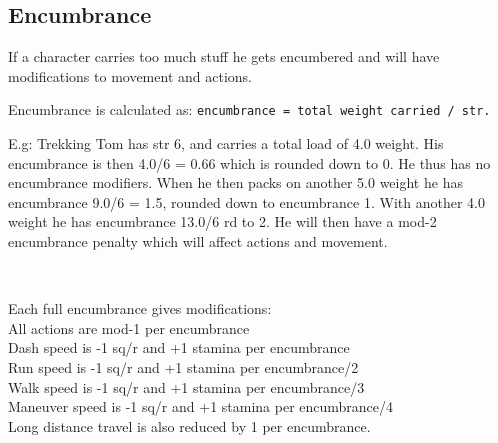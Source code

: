 















\subsection*{Encumbrance}
If a character carries too much stuff he gets encumbered and will have modifications to movement and actions.

\noindent 
Encumbrance is calculated as: \verb|encumbrance = total weight carried / str.|

E.g: Trekking Tom has str 6, and carries a total load of 4.0 weight. His encumbrance is then 4.0/6 = 0.66 which is rounded down to 0. He thus has no encumbrance modifiers. When he then packs on another 5.0 weight he has encumbrance 9.0/6 = 1.5, rounded down to encumbrance 1. With another 4.0 weight he has encumbrance 13.0/6 rd to 2. He will then have a mod-2 encumbrance penalty which will affect actions and movement.

\

\noindent
Each full encumbrance gives modifications: \\
All actions are mod-1 per encumbrance \\
Dash speed is -1 sq/r and +1 stamina per encumbrance \\
Run speed is -1 sq/r and +1 stamina per encumbrance/2 \\
Walk speed is -1 sq/r and +1 stamina per encumbrance/3 \\
Maneuver speed is -1 sq/r and +1 stamina per encumbrance/4 \\
Long distance travel is also reduced by 1 per encumbrance. \\

